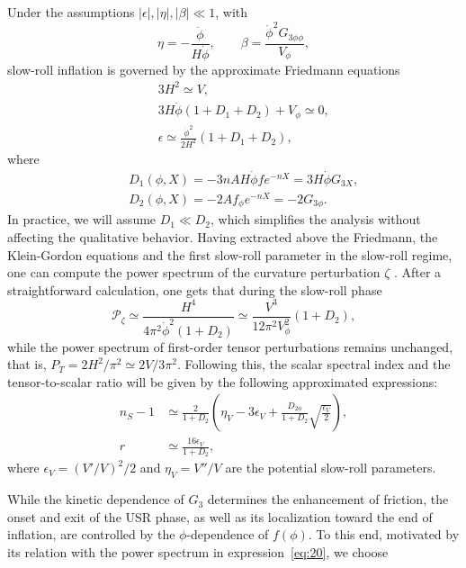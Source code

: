 \documentclass[nofootinbib,aps,a4paper,letterpaper,superscriptaddress,
twocolumn,times]{revtex4}
\renewcommand{\(}{\left(}
\renewcommand{\)}{\right)}
\renewcommand{\(}{\left(}
\renewcommand{\)}{\right)}
\renewcommand{\[}{\left[}
\renewcommand{\]}{\right]}
\begin{document}
Under the assumptions $|\epsilon|,|\eta|,|\beta| \ll 1$, with
\begin{equation}
\eta = -\frac{\ddot{\phi}}{H\dot{\phi}}, \qquad
\beta = \frac{\dot{\phi}^2 G_{3\phi\phi}}{V_\phi},
\end{equation}
slow-roll inflation is governed by the approximate Friedmann equations
\begin{eqnarray}
\label{Fr1approx}
&&3H^2  \simeq V, \\
&&3H\dot{\phi}(1+D_1+D_2) + V_\phi \simeq 0, 
\label{Fr2approx}\\
&&\epsilon \simeq \frac{\dot{\phi}^2}{2H^2}(1+D_1+D_2),
\label{epsapprox}
\end{eqnarray}
where
\begin{eqnarray}
&&D_1(\phi,X) = -3nAH\dot{\phi}f e^{-nX}
= 3H\dot{\phi}G_{3X}, \nonumber\\
&& D_2(\phi,X) = -2Af_\phi e^{-nX}
= -2G_{3\phi}.
\end{eqnarray}
In practice, we will assume $D_1 \ll D_2$, which simplifies the analysis 
without affecting the qualitative behavior. Having extracted above the Friedmann, the Klein-Gordon equations and the first slow-roll parameter in the slow-roll regime, one can compute the power spectrum of the curvature perturbation $\zeta$ \cite{Kobayashi:2011nu}. After a straightforward calculation, one gets that during the slow-roll phase
\begin{equation}
    \mathcal{P}_\zeta \simeq \frac{H^4}{4\pi^2 \dot{\phi}^2(1 + D_2)} \simeq \frac{V^3}{12\pi^2 V_\phi^2 }(1 + D_2), \label{eq:20}
\end{equation}
while the power spectrum of first-order tensor perturbations remains unchanged, that is, $P_T = 2H^2/\pi^2 \simeq 2V /3\pi^2$. Following this, the scalar spectral index and the tensor-to-scalar ratio will be given by the following approximated expressions:  
\begin{align}
    n_S - 1 &\simeq \frac{2}{1 + D_2} \left( \eta_V - 3\epsilon_V + \frac{D_{2\phi}}{1 + D_2} \sqrt{\frac{\epsilon_V}{2}} \right), \label{eq:21}\nonumber \\
    r &\simeq \frac{16 \epsilon_V}{1 + D_2},
\end{align}
where $\epsilon_V = (V'/V)^2/2$ and $\eta_V = V''/V$ are the potential slow-roll parameters.

While the kinetic dependence of $G_3$ determines the enhancement of friction, 
the onset and exit of the USR phase, as well as its localization toward the end 
of inflation, are controlled by the $\phi$-dependence of $f(\phi)$. To this 
end, motivated by its relation with the power spectrum in
expression~\eqref{eq:20}, we choose
\end{document}
